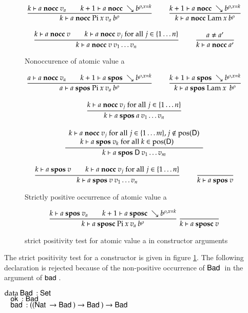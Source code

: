 \begin{figure}
\begin{gather*}
\ \dfrac{k\vdash a\mbox{ \textbf{nocc} }v_a \qquad k+1\vdash a\mbox{ \textbf{nocc} }\searrow b^{\rho,x=k}}{k\vdash a\mbox{ \textbf{nocc} }\mathrm{Pi} \: x \: v_a \: b^{\rho}  }
\qquad
\ \dfrac{k+1\vdash a\mbox{ \textbf{nocc} }\searrow b^{\rho,x=k}}{k\vdash a\mbox{ \textbf{nocc} }\mathrm{Lam} \: x \: b^{\rho}  }
\\[2ex]
\ \dfrac{k\vdash a\mbox{ \textbf{nocc} }v \qquad k\vdash a\mbox{ \textbf{nocc} }v_j \mbox{ for all } j \in \{1 \ldots n \}}{k\vdash a\mbox{ \textbf{nocc} }v \: v_1 \ldots v_n}
\qquad
\ \dfrac{a \neq a'}{k\vdash a\mbox{ \textbf{nocc} }a'}
\end{gather*}
\caption{Nonoccurence of atomic value a}
\end{figure}

\begin{figure}
\begin{gather*}
\ \dfrac{ a\vdash a\mbox{ \textbf{nocc} }v_a \qquad k+1\vdash a\mbox{ \textbf{spos} }\searrow b^{\rho,x=k}}{a\vdash a\mbox{ \textbf{spos} }\mathrm{Pi} \: x \: v_a \: b^{\rho}  }
\qquad
\ \dfrac{k+1\vdash a\mbox{ \textbf{spos} }\searrow b^{\rho,x=k}}{k\vdash a\mbox{ \textbf{spos} }\mathrm{Lam} \: x \: \: b^{\rho}  }
\\[2ex]
\ \dfrac{k\vdash a\mbox{ \textbf{nocc} }v_j \mbox{ for all } j \in \{1 \ldots n \}}{k\vdash a\mbox{ \textbf{spos} }a \: v_1 \ldots v_n}
\\[2ex]
\ \dfrac{\begin{array}[b]{c}k\vdash a\mbox{ \textbf{nocc} }v_j \mbox{ for all } j \in \{ 1 \ldots m\} , j \notin \mbox{pos}(\mathsf{D})\\k\vdash a\mbox{ \textbf{spos} }v_k \mbox{ for all } k \in \mbox{pos}(\mathsf{D}) \qquad\end{array}}{k\vdash a\mbox{ \textbf{spos} }\mathsf{D} \: v_1 \ldots v_m}
\\[2ex]
\ \dfrac{k\vdash a\mbox{ \textbf{spos} }v \qquad k\vdash a\mbox{ \textbf{nocc} }v_j \mbox{ for all } j \in \{1 \ldots n \}}{k\vdash a\mbox{ \textbf{spos} }v \: v_1 \ldots v_n}
\qquad
\ \dfrac{}{k\vdash a\mbox{ \textbf{spos} }v}
\end{gather*}
\caption{Strictly positive occurrence of atomic value a}
\end{figure}


\begin{figure}
\label{sposcf}
\begin{gather*}
\ \dfrac{ k\vdash a\mbox{ \textbf{spos} }v_a \qquad k+1\vdash a\mbox{ \textbf{sposc} }\searrow b^{\rho,x=k}}{k\vdash a\mbox{ \textbf{sposc} }\mathrm{Pi} \: x \: v_a \: b^{\rho}  }
\ \dfrac{}{k\vdash a\mbox{ \textbf{sposc} }v}
\end{gather*}
\caption{strict positivity test for atomic value a in constructor arguments}
\end{figure}

The strict positivity test for a constructor is given in figure \ref{sposcf}.
The following declaration is rejected because of the non-positive occurrence of $\mathsf{Bad}\:$ in the argument of $\mathsf{bad}\:$.
\begin{bsp}
$\mathrm{data}\: \mathsf{Bad}\: : \mathsf{Set} $ \\
$\hspace*{3mm} \mathsf{ok}\: : \mathsf{Bad}\:$\\
$\hspace*{3mm} \mathsf{bad}\: : ((\mathsf{Nat}\: \rightarrow \mathsf{Bad}\:) \rightarrow \mathsf{Bad}\:) \rightarrow \mathsf{Bad}\:  $
\end{bsp}

